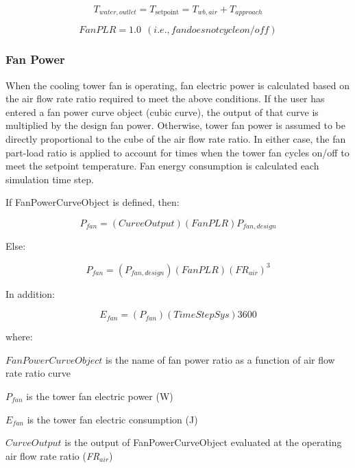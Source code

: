 \begin{equation}
{T_{water,outlet}} = {T_{{\mathrm{setpoint}}}} = {T_{wb,air}} + {T_{approach}}
\end{equation}

\begin{equation}
FanPLR = 1.0~~(i.e., fan does not cycle on/off)
\end{equation}

\subsubsection{Fan Power}\label{fan-power}

When the cooling tower fan is operating, fan electric power is calculated based on the air flow rate ratio required to meet the above conditions. If the user has entered a fan power curve object (cubic curve), the output of that curve is multiplied by the design fan power. Otherwise, tower fan power is assumed to be directly proportional to the cube of the air flow rate ratio. In either case, the fan part-load ratio is applied to account for times when the tower fan cycles on/off to meet the setpoint temperature. Fan energy consumption is calculated each simulation time step.

If FanPowerCurveObject is defined, then:

\begin{equation}
  P_{fan} = \left( {CurveOutput} \right)\left( {FanPLR} \right){P_{fan,design}}
\end{equation}

Else:

\begin{equation}
  P_{fan} = \left( {{P_{fan,design}}} \right)\left( {FanPLR} \right){\left( {F{R_{air}}} \right)^{\mathrm{3}}}
\end{equation}

In addition:

\begin{equation}
{E_{fan}} = \left( {{P_{fan}}} \right)\left( {TimeStepSys} \right)3600
\end{equation}

where:

\(FanPowerCurveObject\) is the name of fan power ratio as a function of air flow rate ratio curve

\({P_{fan}}\) is the tower fan electric power (W)

\({E_{fan}}\) is the tower fan electric consumption (J)

\(CurveOutput\) is the output of FanPowerCurveObject evaluated at the operating air flow rate ratio (\emph{FR\(_{air}\)})

